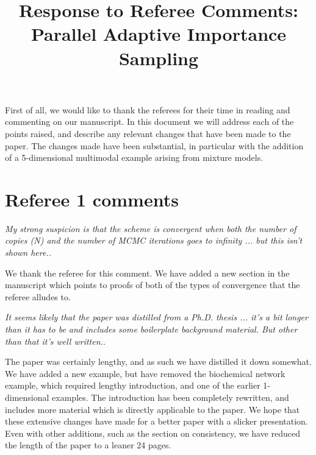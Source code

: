 \documentclass{article}
\newcommand{\comment}[2]{\vspace{0.6cm}{\bf Comment:} {\it #1.}

\vspace{0.3cm}{\bf Answer:} #2}
\begin{document}
\title{Response to Referee Comments: Parallel Adaptive Importance Sampling}
\maketitle
First of all, we would like to thank the referees for
their time in reading and commenting on our manuscript. In this document
we will address each of the points raised, and describe any relevant
changes that have been made to the paper. The changes made have been substantial, in particular with the addition of a 5-dimensional multimodal example arising from mixture models.



\section*{Referee 1 comments}
\comment{My strong suspicion is that the scheme is convergent when both the number of copies (N) and the number of MCMC iterations goes to infinity ... but this isn't shown here.}{We thank the referee for this comment. We have added a new section in the manuscript which points to proofs of both of the types of convergence that the referee alludes to.}

\comment{It seems likely that the paper was distilled from a Ph.D. thesis ... it's a bit longer than it has to be and includes some boilerplate background material. But other than that it's well written.}{The paper was certainly lengthy, and as such we have distilled it down somewhat. We have added a new example, but have removed the biochemical network example, which required lengthy introduction, and one of the earlier 1-dimensional examples. The introduction has been completely rewritten, and includes more material which is directly applicable to the paper. We hope that these extensive changes have made for a better paper with a slicker presentation. Even with other additions, such as the section on consistency, we have reduced the length of the paper to a leaner 24 pages.}
\end{document}
